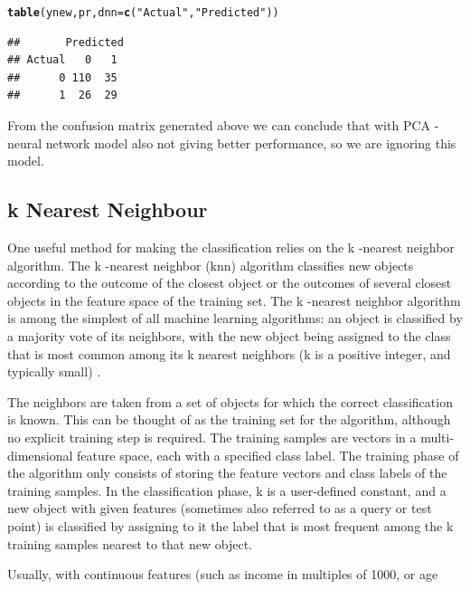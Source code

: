 \documentclass{article}\usepackage[]{graphicx}\usepackage[]{color}
\makeatletter
\newcommand{\hlstr}[1]{\textcolor[rgb]{0.192,0.494,0.8}{#1}}%
\newcommand{\hlstd}[1]{\textcolor[rgb]{0.345,0.345,0.345}{#1}}%
\newcommand{\hlkwc}[1]{\textcolor[rgb]{0.333,0.667,0.333}{#1}}%
\newcommand{\hlkwd}[1]{\textcolor[rgb]{0.737,0.353,0.396}{\textbf{#1}}}%
\newenvironment{kframe}{%
 \def\at@end@of@kframe{}%
 \ifinner\ifhmode%
  \def\at@end@of@kframe{\end{minipage}}%
  \begin{minipage}{\columnwidth}%
 \fi\fi%
 \def\FrameCommand##1{\hskip\@totalleftmargin \hskip-\fboxsep
 \colorbox{shadecolor}{##1}\hskip-\fboxsep
     \hskip-\linewidth \hskip-\@totalleftmargin \hskip\columnwidth}%
 \MakeFramed {\advance\hsize-\width
   \@totalleftmargin\z@ \linewidth\hsize
   \@setminipage}}%
 {\par\unskip\endMakeFramed%
 \at@end@of@kframe}
\newenvironment{knitrout}{}{} %
\makeatother
\begin{document}
\begin{knitrout}
\color{fgcolor}\begin{kframe}
\begin{alltt}
\hlkwd{table}\hlstd{(ynew, pr,}\hlkwc{dnn}\hlstd{=}\hlkwd{c}\hlstd{(}\hlstr{"Actual"}\hlstd{,} \hlstr{"Predicted"}\hlstd{))}
\end{alltt}
\begin{verbatim}
##       Predicted
## Actual   0   1
##      0 110  35
##      1  26  29
\end{verbatim}
\end{kframe}
\end{knitrout}
From the confusion matrix generated above we can conclude that with PCA -neural network model also not giving better performance, so we are ignoring this model.
\subsection{k Nearest Neighbour}\hspace{0.9cm} One useful method for making the classification relies on the k -nearest neighbor algorithm. The k -nearest neighbor (knn) algorithm classifies new objects according to the outcome of the closest object or the outcomes of several closest objects in the feature space of the training set. The k -nearest neighbor algorithm is among the simplest of all machine learning algorithms: an object is classified by a majority vote of its neighbors, with the new object being assigned to the class that is most common among its k nearest neighbors (k is a positive integer, and typically small) \cite{[4]}.\par
\hspace{0.5cm} The neighbors are taken from a set of objects for which the correct classification
is known. This can be thought of as the training set for the algorithm, although no explicit training step is required. The training samples are vectors in a multi-dimensional feature space, each with a specified class label. The training phase of the algorithm only consists of storing the feature vectors and class labels of the training samples. In the classification phase, k is a user-defined constant, and a new object with given features (sometimes also referred to as a query or test point) is classified by assigning to it the label that is most frequent among the k training samples nearest to that new object.\par
\hspace{0.5cm}Usually, with continuous features (such as income in multiples of 1000, or age
\end{document}
